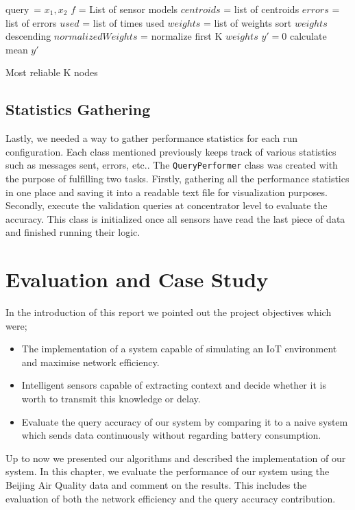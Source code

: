 \documentclass{mproj}
\begin{document}
\begin{algorithm}[H]
 query\ = $x_1,x_2$\;
 $f$ = List of sensor models\;
 $centroids$ = list of centroids\;
 $errors$ = list of errors\;
 $used$ = list of times used\;
 $weights$ = list of weights\;
 sort $weights$ descending\;
 $normalizedWeights$ = normalize first K $weights$\;
 $y'=0$\;
 calculate mean $y'$\;
 \caption{Most reliable K nodes}
 \label{alg:reliableModels}
\end{algorithm}

\section{Statistics Gathering}
Lastly, we needed a way to gather performance statistics for each run configuration. Each class mentioned previously keeps track of various statistics such as messages sent, errors, etc.. The \texttt{QueryPerformer} class was created with the purpose of fulfilling two tasks. Firstly, gathering all the performance statistics in one place and saving it into a readable text file for visualization purposes. Secondly, execute the validation queries at concentrator level to evaluate the accuracy. This class is initialized once all sensors have read the last piece of data and finished running their logic.

\chapter{Evaluation and Case Study}
In the introduction of this report we pointed out the project objectives which were;
\begin{itemize}  
\item The implementation of a system capable of simulating an IoT environment and maximise network efficiency.
\item Intelligent sensors capable of extracting context and decide whether it is worth to transmit this knowledge or delay.
\item Evaluate the query accuracy of our system by comparing it to a naive system which sends data continuously without regarding battery consumption.  
\end{itemize} 
Up to now we presented our algorithms and described the implementation of our system. In this chapter, we evaluate the performance of our system using the Beijing Air Quality data\cite{air-quality-inference-meets-big-data} and comment on the results. This includes the evaluation of both the network efficiency and the query accuracy contribution.
\end{document}
